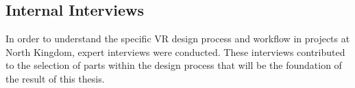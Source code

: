 \subsection{Internal Interviews}
In order to understand the specific VR design process and workflow in projects at North Kingdom, expert interviews were conducted. These interviews contributed to the selection of parts within the design process that will be the foundation of the result of this thesis.
